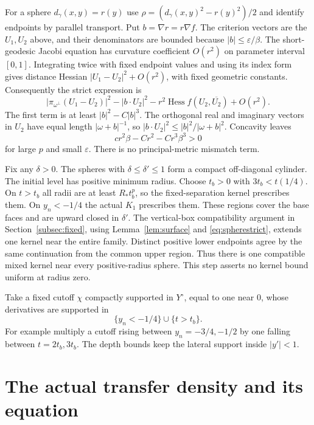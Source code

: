 \documentclass[11pt]{article}
\theoremstyle{definition}\newtheorem{definition}[theorem]{Definition}
\theoremstyle{remark}\newtheorem{remark}[theorem]{Remark}
\newcommand{\Hess}{\operatorname{Hess}}
\begin{document}
For a sphere $d_\gamma(x,y)=r(y)$ use
$\rho=(d_\gamma(x,y)^2-r(y)^2)/2$ and identify endpoints by parallel
transport. Put $b=\nabla r=r\nabla f$. The criterion vectors are the
$U_1,U_2$ above, and their denominators are bounded because
$|b|\le\varepsilon/\beta$. The short-geodesic Jacobi equation has
curvature coefficient $O(r^2)$ on parameter interval $[0,1]$.
Integrating twice with fixed endpoint values and using its index form
gives distance Hessian $|U_1-U_2|^2+O(r^2)$, with fixed geometric constants.
Consequently the strict expression is
\[
 |\pi_{\omega^\perp}(U_1-U_2)|^2-|b\cdot U_2|^2
             -r^2\Hess f(U_2,\overline{U_2})+O(r^2).
\]
The first term is at least $|b|^2-C|b|^3$. The orthogonal real and
imaginary vectors in $U_2$ have equal length $|\omega+b|^{-1}$, so
$|b\cdot U_2|^2\le |b|^2/|\omega+b|^2$. Concavity leaves
\begin{equation}\label{eq:spherestrict}
 cr^2\beta-Cr^2-Cr^3\beta^3>0
\end{equation}
for large $p$ and small $\varepsilon$. There is no principal-metric
mismatch term.

Fix any $\delta>0$. The spheres with $\delta\le\delta'\le1$ form a
compact off-diagonal cylinder. The initial level has positive minimum
radius. Choose $t_b>0$ with $3t_b<t(1/4)$. On $t>t_b$ all radii are
at least $R_*t_b^p$, so the fixed-separation kernel prescribes them.
On $y_n<-1/4$ the actual $K_1$ prescribes them. These regions cover
the base faces and are upward closed in $\delta'$. The vertical-box
compatibility argument in Section~\ref{subsec:fixed}, using
Lemma~\ref{lem:surface} and \eqref{eq:spherestrict}, extends one kernel
near the entire family. Distinct positive lower endpoints agree by the
same continuation from the common upper region. Thus there is one
compatible mixed kernel near every positive-radius sphere. This step
asserts no kernel bound uniform at radius zero.

Take a fixed cutoff $\chi$ compactly supported in $Y^\circ$, equal to
one near $0$, whose derivatives are supported in
\begin{equation}\label{eq:cutoffsupport}
 \{y_n<-1/4\}\cup\{t>t_b\}.
\end{equation}
For example multiply a cutoff rising between $y_n=-3/4,-1/2$ by one
falling between $t=2t_b,3t_b$. The depth bounds keep the lateral support
inside $|y'|<1$.

\section{The actual transfer density and its equation}\label{sec:trace}
\end{document}
